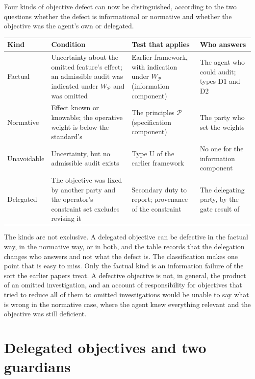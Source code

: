 \documentclass[11pt]{article}
\theoremstyle{plain}
\theoremstyle{definition}
\begin{document}
Four kinds of objective defect can now be distinguished, according to the two questions whether the defect is informational or normative and whether the objective was the agent's own or delegated.

\begin{center}
\small
\begin{tabular}{@{}p{}p{}p{}p{}@{}}
\hline
Kind & Condition & Test that applies & Who answers\\
\hline
Factual & Uncertainty about the omitted feature's effect; an admissible audit was indicated under $W_{\mathcal P}$ and was omitted & Earlier framework, with indication under $W_{\mathcal P}$ (information component) & The agent who could audit; types D1 and D2\\
Normative & Effect known or knowable; the operative weight is below the standard's & The principles $\mathcal P$ (specification component) & The party who set the weights\\
Unavoidable & Uncertainty, but no admissible audit exists & Type U of the earlier framework & No one for the information component\\
Delegated & The objective was fixed by another party and the operator's constraint set excludes revising it & Secondary duty to report; provenance of the constraint & The delegating party, by the gate result of \cite{flyxion2026shared}\\
\hline
\end{tabular}
\end{center}

The kinds are not exclusive. A delegated objective can be defective in the factual way, in the normative way, or in both, and the table records that the delegation changes who answers and not what the defect is. The classification makes one point that is easy to miss. Only the factual kind is an information failure of the sort the earlier papers treat. A defective objective is not, in general, the product of an omitted investigation, and an account of responsibility for objectives that tried to reduce all of them to omitted investigations would be unable to say what is wrong in the normative case, where the agent knew everything relevant and the objective was still deficient.

\section{Delegated objectives and two guardians}\label{sec:guardians}
\end{document}
